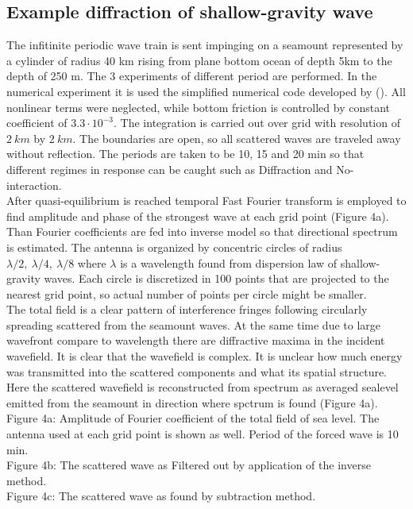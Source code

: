 \subsection{Example diffraction of shallow-gravity wave}
The infitinite periodic wave train is sent impinging on a seamount represented by a cylinder of 
radius 40 km rising from plane bottom ocean of depth 5km to the depth of 250 m. The 3 experiments 
of different period are performed. In the numerical experiment it is used the simplified numerical 
code developed by (\cite{kowalik2005numerical}). All nonlinear terms were neglected, while bottom 
friction is controlled by constant coefficient of $3.3 \cdot 10^{-3}$. The integration is carried 
out over grid with resolution of $2~km$ by $2~km$. The boundaries are open, so all scattered waves 
are traveled away without reflection. The periods are taken to be 10, 15 and 20 min so 
that different regimes in response can be caught such as Diffraction and No-interaction.\\
After quasi-equilibrium is reached temporal Fast Fourier transform is employed to find amplitude 
and phase of the strongest wave at each grid point (Figure 4a). Than Fourier coefficients are fed 
into inverse model so that directional spectrum is estimated. The antenna is organized by 
concentric circles of radius $ \lambda/2,~\lambda/4,~\lambda/8 $ where $ \lambda $ is a wavelength 
found from dispersion law of shallow-gravity waves. Each circle is discretized in 100 points that 
are projected to the nearest grid point, so actual number of points per circle might be smaller.\\
The total field is a clear pattern of interference fringes following circularly spreading scattered 
from the seamount waves. At the same time due to large wavefront compare to wavelength there are 
diffractive maxima in the incident wavefield. It is clear that the wavefield is complex. It is 
unclear how much energy was transmitted into the scattered components and what its spatial 
structure. Here the scattered wavefield is reconstructed from spectrum as averaged sealevel emitted 
from the seamount in direction where spctrum is found (Figure 4a).\\

Figure 4a: Amplitude of Fourier coefficient of the total field of sea level. The antenna used at 
each grid point is shown as well. Period of the forced wave is 10 min.\\
Figure 4b: The scattered wave as Filtered out by application of the inverse method.\\
Figure 4c: The scattered wave as found by subtraction method.\\


